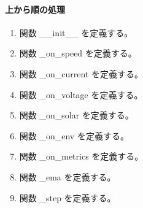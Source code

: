 \documentclass[a4paper,11pt]{article}
\begin{document}
            \paragraph{上から順の処理}
            \begin{enumerate}[leftmargin=1.8em]
            \item 関数 \_\_init\_\_ を定義する。
\item 関数 \_on\_speed を定義する。
\item 関数 \_on\_current を定義する。
\item 関数 \_on\_voltage を定義する。
\item 関数 \_on\_solar を定義する。
\item 関数 \_on\_env を定義する。
\item 関数 \_on\_metrics を定義する。
\item 関数 \_ema を定義する。
\item 関数 \_step を定義する。
            \end{enumerate}
\end{document}
